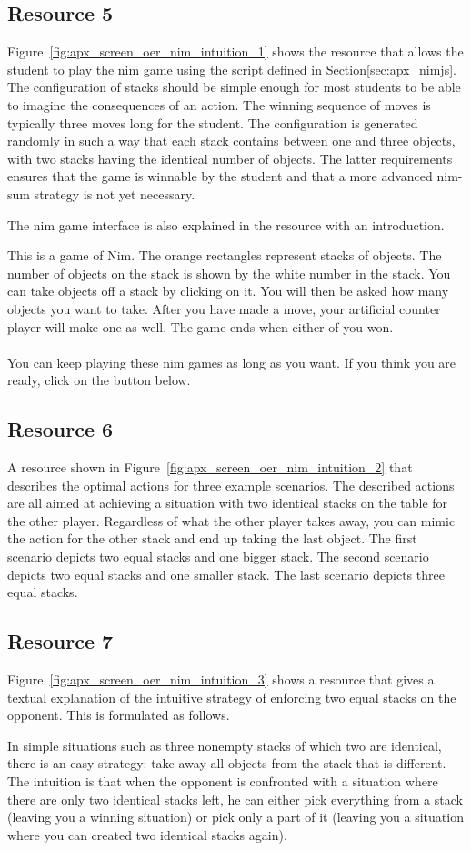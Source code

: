 \subsection{Resource 5}
Figure~\ref{fig:apx_screen_oer_nim_intuition_1} shows the resource that allows the
student to play the nim game using the script defined in
Section\ref{sec:apx_nimjs}. The configuration of
stacks should be simple enough for most students to be able to imagine the
consequences of an action. The winning sequence of moves is
typically three moves long for the student. The configuration is generated
randomly in such a way that each stack contains between one and
three objects, with two stacks having the identical number of objects. The
latter requirements ensures that the game is winnable by the student and that a
more advanced nim-sum strategy is not yet necessary.

The nim game interface is also explained in the resource with an introduction.
\begin{framed}\noindent
This is a game of Nim. The orange rectangles represent stacks of objects. The
number of objects on the stack is shown by the white number in the stack. You
can take objects off a stack by clicking on it. You will then be asked how many
objects you want to take. After you have made a move, your artificial counter
player will make one as well. The game ends when either of you won.\\\\
\noindent You can keep playing these nim games as long as you want.
If you think you are ready, click on the button below.
\end{framed}
\subsection{Resource 6}
A resource shown in Figure~\ref{fig:apx_screen_oer_nim_intuition_2} that
describes the optimal actions for three example scenarios. The described actions
are all aimed at achieving a situation with two identical stacks on the table
for the other player. Regardless of what the other player takes away,
you can mimic the action for the other stack and end up taking the last object.
The first scenario depicts two equal stacks and one bigger stack.
The second scenario depicts two equal stacks and one smaller stack.
The last scenario depicts three equal stacks.
\subsection{Resource 7}
Figure~\ref{fig:apx_screen_oer_nim_intuition_3} shows a resource that gives a
textual explanation of the intuitive strategy of enforcing two equal stacks on
the opponent. This is formulated as follows.
\begin{framed}\noindent
In simple situations such as three nonempty stacks of which two are identical,
there is an easy strategy: take away all objects from the stack that is
different. The intuition is that when the opponent is confronted with a
situation where there are only two identical stacks left, he can either pick
everything from a stack (leaving you a winning situation) or pick only a part
of it (leaving you a situation where you can created two identical stacks again).
\end{framed}
